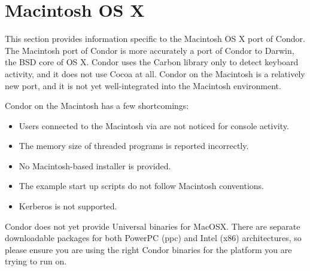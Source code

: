 \section{\label{sec:platform-macos}Macintosh OS X}

This section provides information specific to the Macintosh OS X port of
Condor.
The Macintosh port of Condor is more accurately a port of Condor to
Darwin, the BSD core of OS X. Condor uses the Carbon library only to
detect keyboard activity, and it does not use Cocoa at all.
Condor on the Macintosh is a relatively new port, and it 
is not yet well-integrated
into the Macintosh environment. 

Condor on the Macintosh has a few shortcomings:
\begin{itemize}
\item Users connected to the Macintosh via  are not
noticed for console activity.
\item The memory size of threaded programs is reported incorrectly.
\item No Macintosh-based installer is provided.
\item The example start up scripts do not follow Macintosh conventions.
\item Kerberos is not supported.
\end{itemize}


Condor does not yet provide Universal binaries for MacOSX.
There are separate downloadable packages for both PowerPC (ppc) and
Intel (x86) architectures, so please ensure you are using the right
Condor binaries for the platform you are trying to run on.
